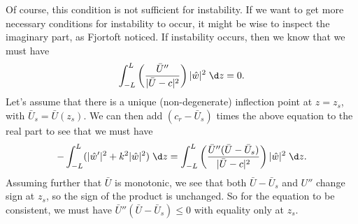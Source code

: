 \documentclass[a4paper]{article}
\begin{document}
Of course, this condition is not sufficient for instability. If we want to get more necessary conditions for instability to occur, it might be wise to inspect the imaginary part, as Fjortoft noticed. If instability occurs, then we know that we must have
\[
  \int_{-L}^L \left(\frac{\bar{U}''}{|\bar{U} - c|^2} \right) |\hat{w}|^2\;\d z = 0.
\]
Let's assume that there is a unique (non-degenerate) inflection point at $z = z_s$, with $\bar{U}_s = \bar{U}(z_s)$. We can then add $(c_r - \bar{U}_s)$ times the above equation to the real part to see that we must have
\[
  -\int_{-L}^L (|\hat{w}'|^2 + k^2 |\hat{w}|^2)\;\d z = \int_{-L}^L \left(\frac{\bar{U}''(\bar{U} - \bar{U}_s)}{ |\bar{U} - c|^2} \right) |\hat{w}|^2\;\d z.
\]
Assuming further that $\bar{U}$ is monotonic, we see that both $\bar{U} - \bar{U}_s$ and $U''$ change sign at $z_s$, so the sign of the product is unchanged. So for the equation to be consistent, we must have $\bar{U}'' (\bar{U} - \bar{U}_s) \leq 0$ with equality only at $z_s$.
\end{document}
